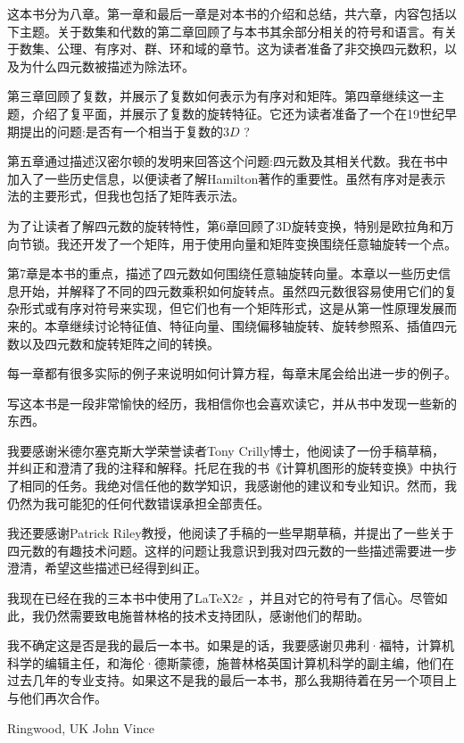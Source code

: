 这本书分为八章。第一章和最后一章是对本书的介绍和总结，共六章，内容包括以下主题。关于数集和代数的第二章回顾了与本书其余部分相关的符号和语言。有关于数集、公理、有序对、群、环和域的章节。这为读者准备了非交换四元数积，以及为什么四元数被描述为除法环。

第三章回顾了复数，并展示了复数如何表示为有序对和矩阵。第四章继续这一主题，介绍了复平面，并展示了复数的旋转特征。它还为读者准备了一个在19世纪早期提出的问题:是否有一个相当于复数的$3 D$ ?

第五章通过描述汉密尔顿的发明来回答这个问题:四元数及其相关代数。我在书中加入了一些历史信息，以便读者了解Hamilton著作的重要性。虽然有序对是表示法的主要形式，但我也包括了矩阵表示法。

为了让读者了解四元数的旋转特性，第6章回顾了3D旋转变换，特别是欧拉角和万向节锁。我还开发了一个矩阵，用于使用向量和矩阵变换围绕任意轴旋转一个点。

第7章是本书的重点，描述了四元数如何围绕任意轴旋转向量。本章以一些历史信息开始，并解释了不同的四元数乘积如何旋转点。虽然四元数很容易使用它们的复杂形式或有序对符号来实现，但它们也有一个矩阵形式，这是从第一性原理发展而来的。本章继续讨论特征值、特征向量、围绕偏移轴旋转、旋转参照系、插值四元数以及四元数和旋转矩阵之间的转换。

每一章都有很多实际的例子来说明如何计算方程，每章末尾会给出进一步的例子。

写这本书是一段非常愉快的经历，我相信你也会喜欢读它，并从书中发现一些新的东西。

我要感谢米德尔塞克斯大学荣誉读者Tony Crilly博士，他阅读了一份手稿草稿，并纠正和澄清了我的注释和解释。托尼在我的书《计算机图形的旋转变换》中执行了相同的任务。我绝对信任他的数学知识，我感谢他的建议和专业知识。然而，我仍然为我可能犯的任何代数错误承担全部责任。

我还要感谢Patrick Riley教授，他阅读了手稿的一些早期草稿，并提出了一些关于四元数的有趣技术问题。这样的问题让我意识到我对四元数的一些描述需要进一步澄清，希望这些描述已经得到纠正。

我现在已经在我的三本书中使用了\LaTeX$ 2\varepsilon$ ，并且对它的符号有了信心。尽管如此，我仍然需要致电施普林格的技术支持团队，感谢他们的帮助。

我不确定这是否是我的最后一本书。如果是的话，我要感谢贝弗利·福特，计算机科学的编辑主任，和海伦·德斯蒙德，施普林格英国计算机科学的副主编，他们在过去几年的专业支持。如果这不是我的最后一本书，那么我期待着在另一个项目上与他们再次合作。


Ringwood, UK  \hfill                                               John Vince
